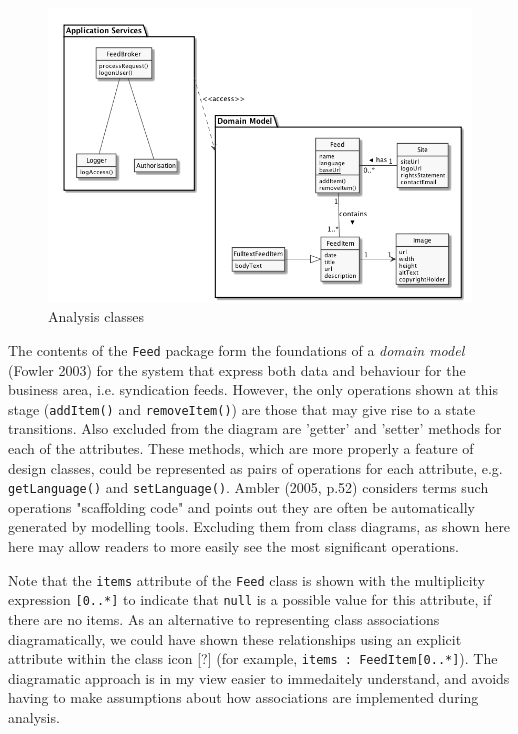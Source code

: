 \documentclass{article}
\begin{document}
\begin{figure}
  \begin{center}
    \includegraphics[width=\textwidth]{analysis-classes.png}
  \end{center}
  \label{analysis-classes}
  \caption{Analysis classes}
\end{figure}

The contents of the \texttt{Feed} package form the foundations of a \textit{domain model} (Fowler 2003) for the system that express both data and behaviour for the business area, i.e. syndication feeds. However, the only operations shown at this stage (\texttt{addItem()} and \texttt{removeItem()}) are those that may give rise to a state transitions. Also excluded from the diagram are 'getter' and 'setter' methods for each of the attributes. These methods, which are more properly a feature of design classes, could be represented as pairs of operations for each attribute, e.g. \texttt{getLanguage()} and \texttt{setLanguage()}. Ambler (2005, p.52) considers terms such operations "scaffolding code" and points out they are often be automatically generated by modelling tools. Excluding them from class diagrams, as shown here here may allow readers to more easily see the most significant operations.

Note that the \texttt{items} attribute of the \texttt{Feed} class is shown with the multiplicity expression \texttt{[0..*]} to indicate that \texttt{null} is a possible value for this attribute, if there are no items. As an alternative to representing class associations diagramatically, we could have shown these relationships using an explicit attribute within the class icon [?] (for example, \texttt{items : FeedItem[0..*]}). The diagramatic approach is in my view easier to immedaitely understand, and avoids having to make assumptions about how associations are implemented during analysis.
\end{document}
